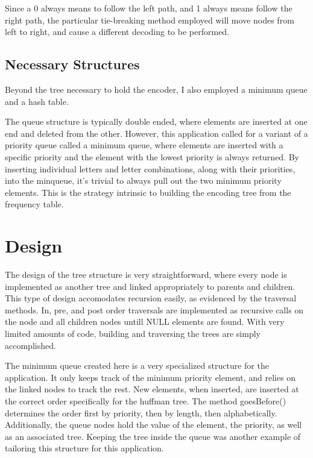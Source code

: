 \documentclass[a4paper,12pt]{article}
\begin{document}
Since a 0 always means to follow the left path, and 1 always means follow the right path, the particular tie-breaking method employed will move nodes from left to right, and cause a different decoding to be performed.

\subsection{Necessary Structures}
Beyond the tree necessary to hold the encoder, I also employed a minimum queue and a hash table.  

The queue structure is typically double ended, where elements are inserted at one end and deleted from the other. However, this application called for a variant of a priority queue called a minimum queue, where elements are inserted with a specific priority and the element with the lowest priority is always returned.  By inserting individual letters and letter combinations, along with their priorities, into the minqueue, it's trivial to always pull out the two minimum priority elements.  This is the strategy intrinsic to building the encoding tree from the frequency table.


\section{Design}
The design of the tree structure is very straightforward, where every node is implemented as another tree and linked appropriately to parents and children.  This type of design accomodates recursion easily, as evidenced by the traversal methods.  In, pre, and post order traversals are implemented as recursive calls on the node and all children nodes untill NULL elements are found.  With very limited amounts of code, building and traversing the trees are simply accomplished.

The minimum queue created here is a very specialized structure for the application.  It only keeps track of the minimum priority element, and relies on the linked nodes to track the rest.  New elements, when inserted, are inserted at the correct order specifically for the huffman tree.  The method goesBefore() determines the order first by priority, then by length, then alphabetically.  Additionally, the queue nodes hold the value of the element, the priority, as well as an associated tree.  Keeping the tree inside the queue was another example of tailoring this structure for this application.
\end{document}

